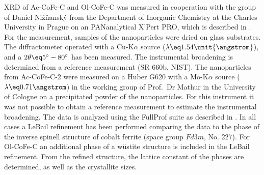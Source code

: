 \documentclass[\main/dresen_thesis.tex]{subfiles}
\begin{document}
    XRD of Ac-CoFe-C and Ol-CoFe-C was measured in cooperation with the group of Daniel Nižňanský from the Department of Inorganic Chemistry at the Charles University in Prague on an PANanalytical X'Pert PRO, which is described in .
    For the measurement, samples of the nanoparticles were dried on glass substrates.
    The diffractometer operated with a Cu-K$\alpha$ source ($\lambda \eq 1.54 \unit{\angstrom}$), and a $2 \theta \eq 5^\circ - 80^\circ$ has been measured.
    The instrumental broadening is determined from a  reference measurement (SR 660b, NIST).
    The nanoparticles from Ac-CoFe-C-2 were measured on a Huber G620 with a Mo-K$\alpha$ source ($\lambda \eq 0.71 \angstrom$) in the working group of Prof.\ Dr Mathur in the University of Cologne on a precipitated powder of the nanoparticles.
    For this instrument it was not possible to obtain a reference measurement to estimate the instrumental broadening.
    The data is analyzed using the FullProf suite \cite{Rodriguez_1993_Recen} as described in .
    In all cases a LeBail refinement has been performed comparing the data to the phase of the inverse spinell structure of cobalt ferrite (space group $Fd\bar{3}m$, No. 227).
    For Ol-CoFe-C an additional phase of a w\"ustite structure is included in the LeBail refinement.
    From the refined structure, the lattice constant of the phases are determined, as well as the crystallite sizes.
\end{document}
